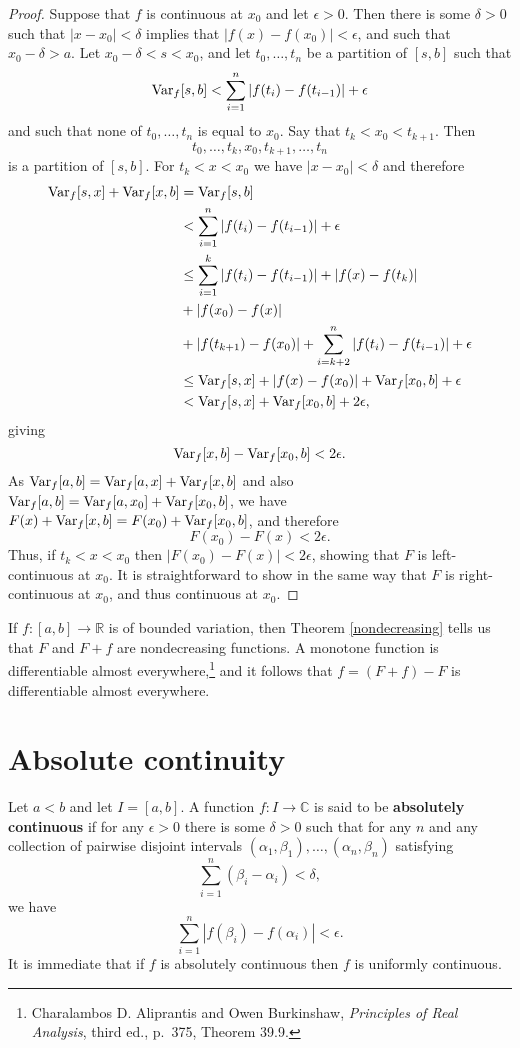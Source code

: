 \documentclass{article}
\newcommand{\Var}{\ensuremath\mathrm{Var}}
\theoremstyle{definition}
\begin{document}
\begin{proof}
Suppose that $f$ is continuous at $x_0$ and let $\epsilon>0$. 
Then there is some $\delta>0$ such that
$|x-x_0|<\delta$ implies that
$|f(x)-f(x_0)|<\epsilon$, and such that $x_0-\delta>a$. Let 
$x_0-\delta<s<x_0$, and  let
$t_0,\ldots,t_n$ be a partition of $[s,b]$ such that
\[
\Var_f[s,b] <\sum_{i=1}^n |f(t_i)-f(t_{i-1})| + \epsilon
\]
and such that none of $t_0,\ldots,t_n$ is equal to $x_0$.
Say that $t_k < x_0 < t_{k+1}$. Then
\[
t_0,\ldots,t_k,x_0,t_{k+1},\ldots,t_n
\]
 is a partition of
$[s,b]$. For $t_k< x< x_0$ we have $|x-x_0| < \delta$ and therefore
\begin{align*}
\Var_f[s,x]+\Var_f[x,b]&=\Var_f[s,b]\\
&<\sum_{i=1}^n |f(t_i)-f(t_{i-1})| + \epsilon\\
&\leq \sum_{i=1}^k  |f(t_i)-f(t_{i-1})| + |f(x)-f(t_k)|\\
&+|f(x_0)-f(x)|\\
&+|f(t_{k+1})-f(x_0)|
+\sum_{i=k+2}^n |f(t_i)-f(t_{i-1})|+\epsilon\\
&\leq \Var_f[s,x]+|f(x)-f(x_0)|+\Var_f[x_0,b]+\epsilon\\
&<\Var_f[s,x]+\Var_f[x_0,b]+2\epsilon,
\end{align*}
giving
\[
\Var_f[x,b]-\Var_f[x_0,b]<2\epsilon.
\]
As  $\Var_f[a,b]=\Var_f[a,x]+\Var_f[x,b]$ and
also
$\Var_f[a,b]=\Var_f[a,x_0]+\Var_f[x_0,b]$, we have
$F(x)+\Var_f[x,b]=F(x_0)+\Var_f[x_0,b]$, and therefore
\[
F(x_0)-F(x)<2\epsilon.
\]
Thus, if $t_k<x<x_0$ then $|F(x_0)-F(x)|<2\epsilon$, showing that 
$F$ is left-continuous at $x_0$. It is straightforward to show in the same way that
$F$ is right-continuous at $x_0$, and thus continuous at $x_0$.
\end{proof}

If $f:[a,b] \to \mathbb{R}$ is of bounded variation, then Theorem \ref{nondecreasing}
tells us that $F$ and $F+f$ are nondecreasing functions. A monotone function is
differentiable almost everywhere,\footnote{Charalambos D. Aliprantis and Owen Burkinshaw, {\em Principles of Real Analysis}, third ed.,
p.~375, Theorem 39.9.} and it follows that $f=(F+f)-F$ is differentiable almost everywhere.




\section{Absolute continuity}
Let $a<b$ and let $I=[a,b]$. A function $f:I \to \mathbb{C}$ is said to be \textbf{absolutely continuous} if
for any $\epsilon>0$ there is some $\delta>0$ such that for any $n$ and any
collection of pairwise disjoint intervals $(\alpha_1,\beta_1),\ldots,(\alpha_n,\beta_n)$
satisfying
\[
\sum_{i=1}^n (\beta_i-\alpha_i) < \delta,
\]
we have
\[
\sum_{i=1}^n |f(\beta_i)-f(\alpha_i)|<\epsilon.
\]
It is immediate that if $f$ is absolutely continuous then $f$ is uniformly continuous.
\end{document}
